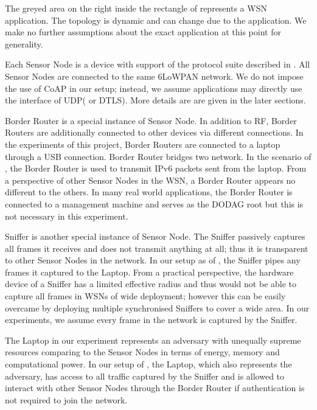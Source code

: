 \begin{description}[style=nextline]
	\item[Sensor Network]
	The greyed area on the right inside the rectangle of  represents a WSN application.  The topology is dynamic and can change due to the application.  We make no further assumptions about the exact application at this point for generality.
	
	\item[Sensor Node]
	Each Sensor Node is a device with support of the protocol suite described in . All Sensor Nodes are connected to the same 6LoWPAN network. We do not impose the use of CoAP in our setup; instead, we assume applications may directly use the interface of UDP( or DTLS). More details are  are given in the later sections.
	
	\item[Border Router]
	Border Router is a special instance of Sensor Node. In addition to RF, Border Routers are additionally connected to other devices via different connections. In the experiments of this project, Border Routers are connected to a laptop through a USB connection. Border Router bridges two network. In the scenario of , the Border Router is used to transmit IPv6 packets sent from the laptop. From a perspective of other Sensor Nodes in the WSN, a Border Router appears no different to the others. In many real world applications, the Border Router is connected to a management machine and serves as the DODAG root but this is not necessary in this experiment.
	
	\item[Sniffer]
	Sniffer is another special instance of Sensor Node. The Sniffer passively captures all frames it receives and does not transmit anything at all; thus it is transparent to other Sensor Nodes in the network. In our setup as of , the Sniffer pipes any frames it captured to the Laptop. From a practical perspective, the hardware device of a Sniffer has a limited effective radius and thus would not be able to capture all frames in WSNs of wide deployment; however this can be easily overcame by deploying multiple synchronised Sniffers to cover a wide area. In our experiments, we assume every frame in the network is captured by the Sniffer.
	
	\item[Laptop]
	The Laptop in our experiment represents an adversary with unequally supreme resources comparing to the Sensor Nodes in terms of energy, memory and computational power. In our setup of , the Laptop, which also represents the adversary, has access to all traffic captured by the Sniffer and is allowed to interact with other Sensor Nodes through the Border Router if authentication is not required to join the network.
\end{description}

